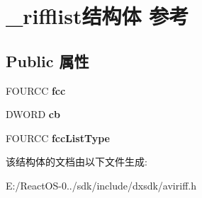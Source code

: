 \hypertarget{struct__rifflist}{}\section{\+\_\+rifflist结构体 参考}
\label{struct__rifflist}
\subsection*{Public 属性}
\begin{DoxyCompactItemize}
\item 
\mbox{\label{struct__rifflist_a0f45764570b25e06d5d12f781a95341c}} 
F\+O\+U\+R\+CC {\bfseries fcc}
\item 
\mbox{\label{struct__rifflist_ab651aefea30affc809db3d0b938c6586}} 
D\+W\+O\+RD {\bfseries cb}
\item 
\mbox{\label{struct__rifflist_afcad7f552ed7109b42a7fc4b6f0eb9d3}} 
F\+O\+U\+R\+CC {\bfseries fcc\+List\+Type}
\end{DoxyCompactItemize}


该结构体的文档由以下文件生成\+:\begin{DoxyCompactItemize}
\item 
E\+:/\+React\+O\+S-\/0../sdk/include/dxsdk/aviriff.\+h\end{DoxyCompactItemize}
